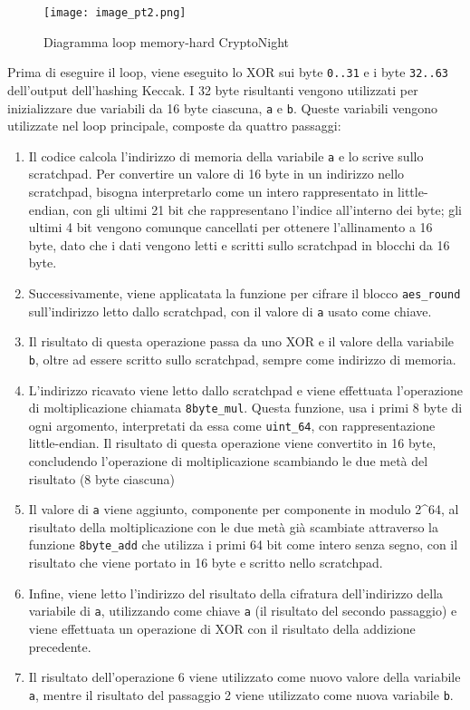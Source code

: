 \begin{figure}[h!]
    \centering
    \texttt{[image: image\_pt2.png]}
    \caption{Diagramma loop memory-hard CryptoNight}
\end{figure}


Prima di eseguire il loop, viene eseguito lo XOR sui byte \texttt{0..31} e i
byte \texttt{32..63} dell'output dell'hashing Keccak. I 32 byte
risultanti vengono utilizzati per inizializzare due variabili da 16 byte
ciascuna, \texttt{a} e \texttt{b}. Queste variabili vengono utilizzate
nel loop principale, composte da quattro passaggi:

\begin{enumerate}
\def\labelenumi{\arabic{enumi}.}
\item
  Il codice calcola l'indirizzo di memoria della variabile \texttt{a} e
  lo scrive sullo scratchpad. Per convertire un valore di 16 byte in un
  indirizzo nello scratchpad, bisogna interpretarlo come un intero
  rappresentato in little-endian, con gli ultimi 21 bit che
  rappresentano l'indice all'interno dei byte; gli ultimi 4 bit vengono
  comunque cancellati per ottenere l'allinamento a 16 byte, dato che i
  dati vengono letti e scritti sullo scratchpad in blocchi da 16 byte.
\item
  Successivamente, viene applicatata la funzione per cifrare il blocco
  \texttt{aes\_round} sull'indirizzo letto dallo scratchpad, con il
  valore di \texttt{a} usato come chiave.
\item
  Il risultato di questa operazione passa da uno XOR e il valore della
  variabile \texttt{b}, oltre ad essere scritto sullo scratchpad, sempre
  come indirizzo di memoria.
\item
  L'indirizzo ricavato viene letto dallo scratchpad e viene effettuata
  l'operazione di moltiplicazione chiamata \texttt{8byte\_mul}. Questa
  funzione, usa i primi 8 byte di ogni argomento, interpretati da essa
  come \texttt{uint\_64}, con rappresentazione little-endian. Il
  risultato di questa operazione viene convertito in 16 byte,
  concludendo l'operazione di moltiplicazione scambiando le due metà del
  risultato (8 byte ciascuna)
\item
  Il valore di \texttt{a} viene aggiunto, componente per componente in
  modulo 2\^{}64, al risultato della moltiplicazione con le due metà già
  scambiate attraverso la funzione \texttt{8byte\_add} che utilizza i
  primi 64 bit come intero senza segno, con il risultato che viene
  portato in 16 byte e scritto nello scratchpad.
\item
  Infine, viene letto l'indirizzo del risultato della cifratura
  dell'indirizzo della variabile di \texttt{a}, utilizzando come chiave
  \texttt{a} (il risultato del secondo passaggio) e viene effettuata un
  operazione di XOR con il risultato della addizione precedente.
\item
  Il risultato dell'operazione 6 viene utilizzato come nuovo valore
  della variabile \texttt{a}, mentre il risultato del passaggio 2 viene
  utilizzato come nuova variabile \texttt{b}.
\end{enumerate}




